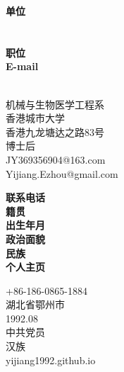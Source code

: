 \documentclass[11pt]{moderncv}
\begin{document}
\begin{CJK*}{UTF8}{gbsn}

 \cnname{\hspace{0.2em}\color{blue}{姜 艺}}
 \maketitle
\vspace{-12mm}

\parbox[t]{2.5cm}{
                \textbf{单位}\\
                \textbf{}\\
                \textbf{}\\
                \textbf{职位}\\
                \textbf{E-mail}\\
                \textbf{}\\
                }
\parbox[t]{5.5cm}{机械与生物医学工程系\\
                香港城市大学\\
                香港九龙塘达之路83号\\
                博士后\\
                JY369356904@163.com\\
                Yijiang.Ezhou@gmail.com\\
                }
\hspace{.3cm}
\parbox[t]{2.5cm}{
               \textbf{联系电话}\\
               \textbf{籍贯}\\
               \textbf{出生年月}\\
               \textbf{政治面貌}\\
               \textbf{民族}\\
               \textbf{个人主页}\\
               }
\parbox[t]{5cm}{
               +86-186-0865-1884\\
               湖北省鄂州市\\
               1992.08\\
               中共党员\\
               汉族\\
               yijiang1992.github.io\\
               }
\vspace{3mm}

\end{CJK*}
\end{document}
